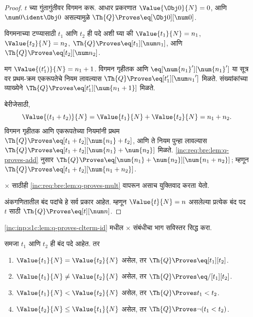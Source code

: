 \begin{proof}
$t$ च्या गुंतागुंतीवर विगमन करू. आधार प्रकरणात
$\Value{\Obj 0}{N} = 0$, आणि
$\num 0 \ident \Obj 0$ असल्यामुळे
$\Th{Q} \Proves \eq[\Obj 0][\num 0]$.

विगमनाच्या टप्प्यासाठी $t_1$ आणि $t_2$ ही पदे अशी घ्या की
$\Value{t_1}{N} = n_1$, $\Value{t_2}{N} = n_2$,
$\Th{Q} \Proves \eq[t_1][\num n_1]$, आणि
$\Th{Q} \Proves \eq[t_2][\num n_2]$.

मग $\Value{(t_1')}{N} = n_1 + 1$. विगमन गृहीतक आणि
$\eq[\num{n_1}'][\num{n_1}']$ या सूत्र वर
प्रथम-क्रम एकरूपतेचे नियम लावल्यास
$\Th{Q} \Proves \eq[t_1'][{\num n_1}']$ मिळते.
संख्यांकांच्या व्याख्येने
$\Th{Q} \Proves \eq[t_1'][\num{n_1 + 1}]$ मिळते.

बेरीजेसाठी,
\[      \Value{(t_1 + t_2)}{N}
    = \Value{t_1}{N} + \Value{t_2}{N}
    = n_1 + n_2.
\]
विगमन गृहीतक आणि एकरूपतेच्या नियमांनी प्रथम
$\Th{Q} \Proves \eq[t_1 + t_2][\num{n_1} + t_2]$,
आणि ते नियम पुन्हा लावल्यास
$\Th{Q} \Proves \eq[t_1 + t_2][\num{n_1} + \num{n_2}]$
मिळते. \ref{inc:req:bre:lem:q-proves-add} नुसार
$\Th{Q} \Proves \eq[\num{n_1} + \num{n_2}][\num{n_1 + n_2}]$;
म्हणून $\Th{Q} \Proves \eq[t_1 + t_2][\num{n_1 + n_2}]$.

$\times$ साठीही
\ref{inc:req:bre:lem:q-proves-mult} वापरून असाच
युक्तिवाद करता येतो.

अंकगणितातील बंद पदांचे हे सर्व प्रकार आहेत. म्हणून
$\Value{t}{N} = n$ असलेल्या प्रत्येक बंद पद~$t$ साठी
$\Th{Q} \Proves \eq[t][\num n]$.
\end{proof}

\begin{prob}
\ref{inc:inp:s1c:lem:q-proves-clterm-id} मधील $\times$ संबंधीचा
भाग सविस्तर सिद्ध करा.
\end{prob}

\begin{lem}
\label{inc:inp:s1c:lem:atomic-completeness}
समजा $t_1$ आणि $t_2$ ही बंद पदे आहेत. तर
\begin{enumerate}
\item $\Value{t_1}{N} = \Value{t_2}{N}$ असेल, तर
    $\Th{Q} \Proves \eq[t_1][t_2]$.
\item $\Value{t_1}{N} \neq \Value{t_2}{N}$ असेल, तर
    $\Th{Q} \Proves \eq/[t_1][t_2]$.
\item $\Value{t_1}{N} < \Value{t_2}{N}$ असेल, तर
    $\Th{Q} \Proves t_1 < t_2$.
\item $\Value{t_2}{N} \leq \Value{t_1}{N}$ असेल, तर
    $\Th{Q} \Proves \lnot(t_1 < t_2)$.
\end{enumerate}
\end{lem}


